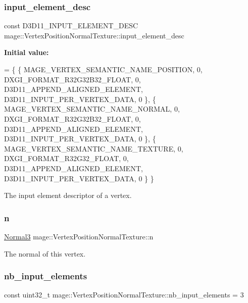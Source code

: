 \subsubsection{\texorpdfstring{input\+\_\+element\+\_\+desc}{input\_element\_desc}}
{\footnotesize\ttfamily const D3\+D11\+\_\+\+I\+N\+P\+U\+T\+\_\+\+E\+L\+E\+M\+E\+N\+T\+\_\+\+D\+E\+SC mage\+::\+Vertex\+Position\+Normal\+Texture\+::input\+\_\+element\+\_\+desc\hspace{0.3cm}{\ttfamily [static]}}

{\bfseries Initial value\+:}
\begin{DoxyCode}
= \{
        \{ MAGE\_VERTEX\_SEMANTIC\_NAME\_POSITION, 0, DXGI\_FORMAT\_R32G32B32\_FLOAT,    0, 
      D3D11\_APPEND\_ALIGNED\_ELEMENT, D3D11\_INPUT\_PER\_VERTEX\_DATA, 0 \},
        \{ MAGE\_VERTEX\_SEMANTIC\_NAME\_NORMAL,   0, DXGI\_FORMAT\_R32G32B32\_FLOAT,    0, 
      D3D11\_APPEND\_ALIGNED\_ELEMENT, D3D11\_INPUT\_PER\_VERTEX\_DATA, 0 \},
        \{ MAGE\_VERTEX\_SEMANTIC\_NAME\_TEXTURE,  0, DXGI\_FORMAT\_R32G32\_FLOAT,       0, 
      D3D11\_APPEND\_ALIGNED\_ELEMENT, D3D11\_INPUT\_PER\_VERTEX\_DATA, 0 \}
    \}
\end{DoxyCode}
The input element descriptor of a vertex. \hypertarget{structmage_1_1_vertex_position_normal_texture_a442eb1609ab596e3e33c26f7be32695a}{}\label{structmage_1_1_vertex_position_normal_texture_a442eb1609ab596e3e33c26f7be32695a} 
\subsubsection{\texorpdfstring{n}{n}}
{\footnotesize\ttfamily \hyperlink{structmage_1_1_normal3}{Normal3} mage\+::\+Vertex\+Position\+Normal\+Texture\+::n}

The normal of this vertex. \hypertarget{structmage_1_1_vertex_position_normal_texture_ae4e7cf708af3f123450ec65a68e21584}{}\label{structmage_1_1_vertex_position_normal_texture_ae4e7cf708af3f123450ec65a68e21584} 
\subsubsection{\texorpdfstring{nb\+\_\+input\+\_\+elements}{nb\_input\_elements}}
{\footnotesize\ttfamily const uint32\+\_\+t mage\+::\+Vertex\+Position\+Normal\+Texture\+::nb\+\_\+input\+\_\+elements = 3\hspace{0.3cm}{\ttfamily [static]}}

